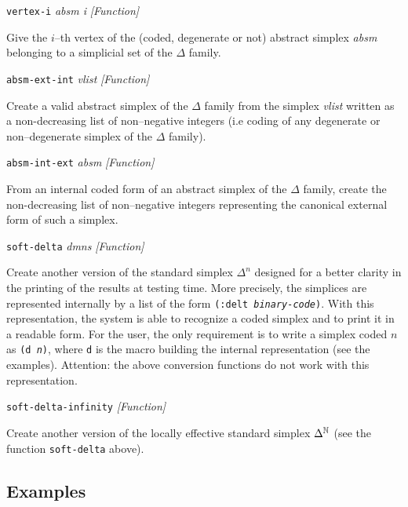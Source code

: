 \newpage
{\parindent=0mm
{\leftskip=5mm 
{\tt vertex-i} {\em absm i} \hfill {\em [Function]}\par}
{\leftskip=15mm 
Give the $i$--th vertex of the (coded, degenerate or not) abstract simplex {\em absm} belonging to a simplicial set
of the $\Delta$ family. \par}
{\leftskip=5mm 
{\tt absm-ext-int} {\em vlist} \hfill {\em [Function]}\par}
{\leftskip=15mm 
Create a valid abstract simplex of the $\Delta$ family from the simplex {\em vlist} written as a non-decreasing list of 
non--negative integers (i.e coding of any degenerate or non--degenerate simplex of the $\Delta$ fa\-mi\-ly). \par}
{\leftskip=5mm 
{\tt absm-int-ext} {\em absm} \hfill {\em [Function]}\par}
{\leftskip=15mm 
From an internal coded form of an abstract simplex of the $\Delta$ family, create the  non-decreasing list
of non--negative integers representing the canonical external form of such a simplex. \par}
{\leftskip=5mm 
{\tt soft-delta} {\em dmns} \hfill {\em [Function]} \par}
{\leftskip=15mm 
Create another version of the standard simplex $\Delta^n$ designed for a better clarity in
the printing of the results at testing time. More precisely, the simplices are represented internally by a list
of the form {\tt (:delt {\em binary-code})}. With this representation, the system is able to
recognize a coded simplex and to print it in a readable form. For the user, the only
requirement is to write a simplex coded $n$ as {\tt (d {\em n})}, where {\tt d} is the macro
building the internal representation (see the examples). Attention: the above conversion
functions do not work with this representation. \par}
{\leftskip=5mm 
{\tt soft-delta-infinity} \hfill {\em [Function]} \par}
{\leftskip=15mm 
Create another version of the locally effective standard simplex $\Delta^{{\Bbb N}}$ 
(see the function {\tt soft-delta} above). \par}
}

\subsection* {Examples}

